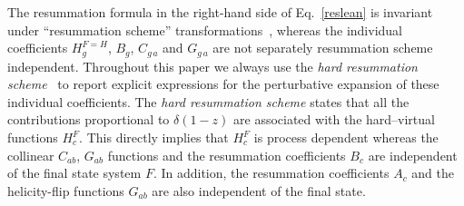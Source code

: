 \documentclass[12pt]{article}
\begin{document}
\begin{appendix}
{\color{black!30}The resummation formula in the right-hand side of Eq.~\eqref{reslean} is invariant under ``resummation scheme''  transformations~\cite{Catani:2000vq}, whereas the individual coefficients $H_g^{F=H}$, $B_{g}$, $C_{g\, a}$ and $G_{g\, a}$ are not separately resummation scheme independent.} 
Throughout this paper we always use the \textit{hard resummation scheme}~\cite{Catani:2013tia} to report explicit expressions for the perturbative expansion of these individual coefficients. The \textit{hard resummation scheme} states that all the contributions proportional to $\delta(1-z)$ are associated with the hard--virtual functions $H_c^{F}$. This directly implies that $H_c^{F}$ is process dependent whereas the collinear $C_{ab}$, $G_{ab}$ functions and the resummation coefficients $B_{c}$ are independent of the final state system $F$. In addition, the resummation coefficients $A_{c}$ and the helicity-flip functions $G_{ab}$ are also independent of the final state.


\end{appendix}
\end{document}
